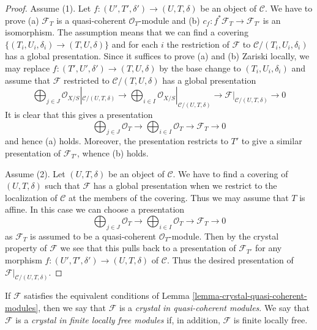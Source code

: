\begin{proof}
Assume (1). Let $f : (U', T', \delta') \to (U, T, \delta)$ be an object of
$\mathcal{C}$. We have to prove (a) $\mathcal{F}_T$ is a quasi-coherent
$\mathcal{O}_T$-module and (b) $c_f : f^*\mathcal{F}_T \to \mathcal{F}_{T'}$
is an isomorphism. The assumption means that we can find a covering
$\{(T_i, U_i, \delta_i) \to (T, U, \delta)\}$ and for each $i$
the restriction of $\mathcal{F}$ to $\mathcal{C}/(T_i, U_i, \delta_i)$
has a global presentation. Since it suffices to prove (a) and (b)
Zariski locally, we may replace $f : (T', U', \delta') \to (T, U, \delta)$
by the base change to $(T_i, U_i, \delta_i)$ and assume that $\mathcal{F}$
restricted to $\mathcal{C}/(T, U, \delta)$ has a global
presentation
$$
\bigoplus\nolimits_{j \in J}
\mathcal{O}_{X/S}|_{\mathcal{C}/(U, T, \delta)} \longrightarrow
\bigoplus\nolimits_{i \in I}
\mathcal{O}_{X/S}|_{\mathcal{C}/(U, T, \delta)} \longrightarrow
\mathcal{F}|_{\mathcal{C}/(U, T, \delta)}
\longrightarrow 0
$$
It is clear that this gives a presentation
$$
\bigoplus\nolimits_{j \in J} \mathcal{O}_T \longrightarrow
\bigoplus\nolimits_{i \in I} \mathcal{O}_T \longrightarrow
\mathcal{F}_T
\longrightarrow 0
$$
and hence (a) holds. Moreover, the presentation restricts to $T'$
to give a similar presentation of $\mathcal{F}_{T'}$, whence (b) holds.

\medskip\noindent
Assume (2). Let $(U, T, \delta)$ be an object of $\mathcal{C}$.
We have to find a covering of $(U, T, \delta)$ such that $\mathcal{F}$ has a
global presentation when we restrict to the localization of $\mathcal{C}$
at the members of the covering. Thus we may assume that $T$ is affine.
In this case we can choose a presentation
$$
\bigoplus\nolimits_{j \in J} \mathcal{O}_T \longrightarrow
\bigoplus\nolimits_{i \in I} \mathcal{O}_T \longrightarrow
\mathcal{F}_T
\longrightarrow 0
$$
as $\mathcal{F}_T$ is assumed to be a quasi-coherent $\mathcal{O}_T$-module.
Then by the crystal property of $\mathcal{F}$ we see that this pulls back
to a presentation of $\mathcal{F}_{T'}$ for any morphism
$f : (U', T', \delta') \to (U, T, \delta)$ of $\mathcal{C}$.
Thus the desired presentation of $\mathcal{F}|_{\mathcal{C}/(U, T, \delta)}$.
\end{proof}

\begin{definition}
\label{definition-crystal-quasi-coherent-modules}
If $\mathcal{F}$ satisfies the equivalent conditions of
Lemma \ref{lemma-crystal-quasi-coherent-modules}, then
we say that $\mathcal{F}$ is a
{\it crystal in quasi-coherent modules}.
We say that $\mathcal{F}$ is a {\it crystal in finite locally free modules}
if, in addition, $\mathcal{F}$ is finite locally free.
\end{definition}

